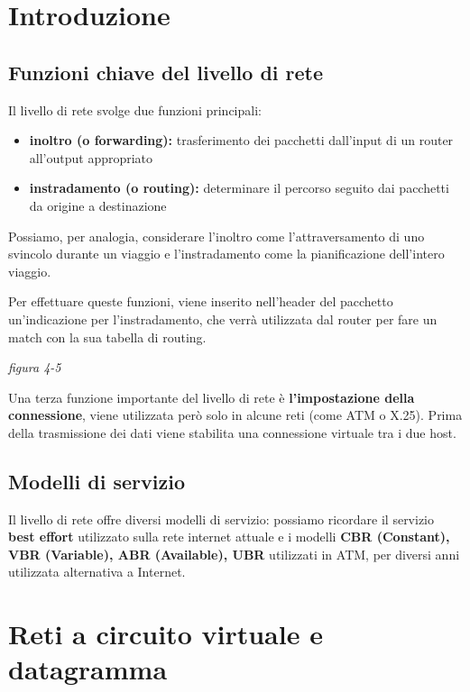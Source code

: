 \documentclass[
]{article}
\author{}
\date{}
\begin{document}
\hypertarget{header-n0}{%
\section{Introduzione}\label{header-n0}}

\hypertarget{header-n2}{%
\subsection{Funzioni chiave del livello di rete}\label{header-n2}}

Il livello di rete svolge due funzioni principali:

\begin{itemize}
\item
  \textbf{inoltro (o forwarding):} trasferimento dei pacchetti
  dall'input di un router all'output appropriato
\item
  \textbf{instradamento (o routing):} determinare il percorso seguito
  dai pacchetti da origine a destinazione
\end{itemize}

Possiamo, per analogia, considerare l'inoltro come l'attraversamento di
uno svincolo durante un viaggio e l'instradamento come la pianificazione
dell'intero viaggio.

Per effettuare queste funzioni, viene inserito nell'header del pacchetto
un'indicazione per l'instradamento, che verrà utilizzata dal router per
fare un match con la sua tabella di routing.

\emph{figura 4-5}

Una terza funzione importante del livello di rete è
\textbf{l'impostazione della connessione}, viene utilizzata però solo in
alcune reti (come ATM o X.25). Prima della trasmissione dei dati viene
stabilita una connessione virtuale tra i due host.

\hypertarget{header-n13}{%
\subsection{Modelli di servizio}\label{header-n13}}

Il livello di rete offre diversi modelli di servizio: possiamo ricordare
il servizio \textbf{best effort} utilizzato sulla rete internet attuale
e i modelli \textbf{CBR (Constant), VBR (Variable), ABR (Available),
UBR} utilizzati in ATM, per diversi anni utilizzata alternativa a
Internet.

\hypertarget{header-n15}{%
\section{Reti a circuito virtuale e datagramma}\label{header-n15}}
\end{document}

